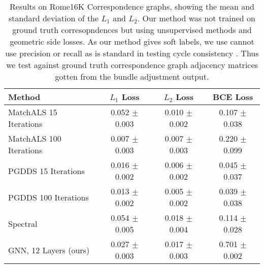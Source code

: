 \documentclass[10pt,twocolumn,letterpaper]{article}
\begin{document}
\begin{table*}
\begin{center}
\begin{tabular}{|l|c|c|c|}
\hline
Method                                                    & $L_1$ Loss        & $L_2$ Loss        & BCE Loss \\

\hline\hline\hline
MatchALS \cite{zhou2015multi} 15 Iterations               & 0.052 $\pm$ 0.003 & 0.010 $\pm$ 0.002 & 0.107 $\pm$ 0.038 \\ \hline
MatchALS \cite{zhou2015multi} 100 Iterations              & 0.007 $\pm$ 0.003 & 0.007 $\pm$ 0.003 & 0.220 $\pm$ 0.099 \\ \hline
PGDDS \cite{leonardos2016distributed} 15 Iterations       & 0.016 $\pm$ 0.002 & 0.006 $\pm$ 0.002 & 0.045 $\pm$ 0.037 \\ \hline
PGDDS \cite{leonardos2016distributed} 100 Iterations      & 0.013 $\pm$ 0.002 & 0.005 $\pm$ 0.002 & 0.039 $\pm$ 0.038 \\ \hline
Spectral                                                  & 0.054 $\pm$ 0.005 & 0.018 $\pm$ 0.004 & 0.114 $\pm$ 0.028 \\ \hline \hline
GNN, 12 Layers (ours)                                     & 0.027 $\pm$ 0.003 & 0.017 $\pm$ 0.003 & 0.701 $\pm$ 0.002 \\
\hline
\end{tabular}
\end{center}

\caption{
Results on Rome16K Correspondence graphs, showing the mean and standard deviation of the $L_1$ and $L_2$.
Our method was not trained on ground truth corresopndences but using unsupervised methods and geometric side losses.
As our method gives soft labels, we use cannot use precision or recall as is standard in testing cycle consistency \cite{zhou2015multi}.
Thus we test against ground truth correspondence graph adjacency matrices gotten from the bundle adjustment output.
}
\end{table*}
\end{document}
